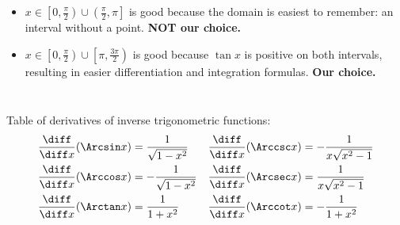 \begin{frame}
\begin{columns}
\begin{itemize}
\item<6-> $x\in \left[0, \frac{\pi}{2}\right)\cup\left(\frac{\pi}{2}, \pi \right] $ is good because the domain is easiest to remember: an interval without a point. \textbf{NOT our choice.}

\item<7,8,9,10-> $x\in \left[0, \frac{\pi}{2} \right) \cup \left[\pi,\frac{3\pi}{2} \right) $ is  good because $\tan x$ is positive on both intervals, resulting in easier differentiation and integration formulas. \textbf{Our choice.} 

\end{itemize}
\end{columns}

\end{frame}

\begin{frame}
Table of derivatives of inverse trigonometric functions: 
\begin{align*}
\frac{\diff}{\diff x} (\Arcsin x) & = %
\frac{1}{\sqrt{1-x^2}} &%
\frac{\diff}{\diff x} (\Arccsc x) & = %
-\frac{1}{x\sqrt{x^2-1}} \\%
\frac{\diff}{\diff x} (\Arccos x) & = %
-\frac{1}{\sqrt{1-x^2}} &%
\frac{\diff}{\diff x} (\Arcsec x) & = %
\frac{1}{x\sqrt{x^2-1}} \\%
\frac{\diff}{\diff x} (\Arctan x) & = %
\frac{1}{1+x^2} &%
\frac{\diff}{\diff x} (\Arccot x) & = %
-\frac{1}{1+x^2} %
\end{align*}
\end{frame}
